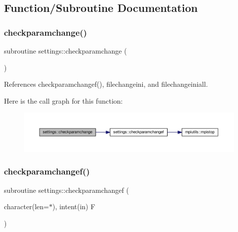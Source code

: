\subsection{Function/\+Subroutine Documentation}
\mbox{\label{namespacesettings_abd4643446df7076be97337eb9aa2f2e9}} 
\subsubsection{\texorpdfstring{checkparamchange()}{checkparamchange()}}
{\footnotesize\ttfamily subroutine settings\+::checkparamchange (\begin{DoxyParamCaption}{ }\end{DoxyParamCaption})}



References checkparamchangef(), filechangeini, and filechangeiniall.

Here is the call graph for this function\+:
\nopagebreak
\begin{figure}[H]
\begin{center}
\leavevmode
\includegraphics[width=350pt]{namespacesettings_abd4643446df7076be97337eb9aa2f2e9_cgraph}
\end{center}
\end{figure}
\mbox{\label{namespacesettings_a7530516bc4d95e285559b9952d6f0dc2}} 
\subsubsection{\texorpdfstring{checkparamchangef()}{checkparamchangef()}}
{\footnotesize\ttfamily subroutine settings\+::checkparamchangef (\begin{DoxyParamCaption}\item[{character(len=$\ast$), intent(in)}]{F }\end{DoxyParamCaption})}



